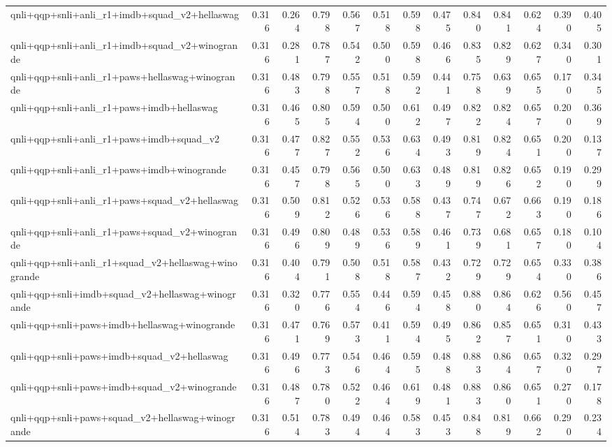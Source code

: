 \begin{table}[t]
\begin{tabular}{lrrrrrrrrrrrr}
    qnli+qqp+snli+anli\_r1+imdb+squad\_v2+hellaswag & 0.316 & 0.264 & 0.798 & 0.567 & 0.518 & 0.598 & 0.475 & 0.840 & 0.841 & 0.624 & 0.390 & 0.405 \\
    qnli+qqp+snli+anli\_r1+imdb+squad\_v2+winogrande & 0.316 & 0.281 & 0.787 & 0.542 & 0.500 & 0.598 & 0.466 & 0.835 & 0.829 & 0.627 & 0.340 & 0.301 \\
    qnli+qqp+snli+anli\_r1+paws+hellaswag+winogrande & 0.316 & 0.483 & 0.798 & 0.557 & 0.518 & 0.592 & 0.441 & 0.758 & 0.639 & 0.655 & 0.170 & 0.345 \\
    qnli+qqp+snli+anli\_r1+paws+imdb+hellaswag & 0.316 & 0.465 & 0.805 & 0.594 & 0.500 & 0.612 & 0.497 & 0.822 & 0.824 & 0.657 & 0.200 & 0.369 \\
    qnli+qqp+snli+anli\_r1+paws+imdb+squad\_v2 & 0.316 & 0.477 & 0.827 & 0.552 & 0.536 & 0.634 & 0.493 & 0.819 & 0.824 & 0.651 & 0.200 & 0.137 \\
    qnli+qqp+snli+anli\_r1+paws+imdb+winogrande & 0.316 & 0.457 & 0.798 & 0.565 & 0.500 & 0.633 & 0.489 & 0.819 & 0.826 & 0.652 & 0.190 & 0.299 \\
    qnli+qqp+snli+anli\_r1+paws+squad\_v2+hellaswag & 0.316 & 0.509 & 0.812 & 0.526 & 0.536 & 0.588 & 0.437 & 0.747 & 0.672 & 0.663 & 0.190 & 0.186 \\
    qnli+qqp+snli+anli\_r1+paws+squad\_v2+winogrande & 0.316 & 0.496 & 0.809 & 0.489 & 0.536 & 0.589 & 0.461 & 0.739 & 0.681 & 0.657 & 0.180 & 0.104 \\
    qnli+qqp+snli+anli\_r1+squad\_v2+hellaswag+winogrande & 0.316 & 0.404 & 0.791 & 0.508 & 0.518 & 0.587 & 0.432 & 0.729 & 0.729 & 0.654 & 0.330 & 0.386 \\
    qnli+qqp+snli+imdb+squad\_v2+hellaswag+winogrande & 0.316 & 0.320 & 0.776 & 0.554 & 0.446 & 0.594 & 0.458 & 0.880 & 0.864 & 0.626 & 0.560 & 0.457 \\
    qnli+qqp+snli+paws+imdb+hellaswag+winogrande & 0.316 & 0.471 & 0.769 & 0.573 & 0.411 & 0.594 & 0.495 & 0.862 & 0.857 & 0.651 & 0.310 & 0.433 \\
    qnli+qqp+snli+paws+imdb+squad\_v2+hellaswag & 0.316 & 0.496 & 0.773 & 0.546 & 0.464 & 0.595 & 0.488 & 0.883 & 0.864 & 0.657 & 0.320 & 0.297 \\
    qnli+qqp+snli+paws+imdb+squad\_v2+winogrande & 0.316 & 0.487 & 0.780 & 0.522 & 0.464 & 0.619 & 0.481 & 0.883 & 0.860 & 0.651 & 0.270 & 0.178 \\
    qnli+qqp+snli+paws+squad\_v2+hellaswag+winogrande & 0.316 & 0.514 & 0.783 & 0.494 & 0.464 & 0.583 & 0.453 & 0.848 & 0.819 & 0.662 & 0.290 & 0.234 \\

\end{tabular}
\end{table}
